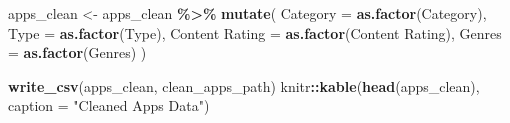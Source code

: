 \documentclass[
]{article}
\newenvironment{Shaded}{\begin{snugshade}}{\end{snugshade}}
\newcommand{\AttributeTok}[1]{\textcolor[rgb]{0.13,0.29,0.53}{#1}}
\newcommand{\FunctionTok}[1]{\textcolor[rgb]{0.13,0.29,0.53}{\textbf{#1}}}
\newcommand{\NormalTok}[1]{#1}
\newcommand{\OtherTok}[1]{\textcolor[rgb]{0.56,0.35,0.01}{#1}}
\newcommand{\SpecialCharTok}[1]{\textcolor[rgb]{0.81,0.36,0.00}{\textbf{#1}}}
\newcommand{\StringTok}[1]{\textcolor[rgb]{0.31,0.60,0.02}{#1}}
\begin{document}
\begin{Shaded}
\begin{Highlighting}[]
\NormalTok{apps\_clean }\OtherTok{\textless{}{-}}\NormalTok{ apps\_clean }\SpecialCharTok{\%\textgreater{}\%}
    \FunctionTok{mutate}\NormalTok{(}
        \AttributeTok{Category =} \FunctionTok{as.factor}\NormalTok{(Category),}
        \AttributeTok{Type =} \FunctionTok{as.factor}\NormalTok{(Type),}
        \StringTok{\textasciigrave{}}\AttributeTok{Content Rating}\StringTok{\textasciigrave{}} \OtherTok{=} \FunctionTok{as.factor}\NormalTok{(}\StringTok{\textasciigrave{}}\AttributeTok{Content Rating}\StringTok{\textasciigrave{}}\NormalTok{),}
        \AttributeTok{Genres =} \FunctionTok{as.factor}\NormalTok{(Genres)}
\NormalTok{    )}

\FunctionTok{write\_csv}\NormalTok{(apps\_clean, clean\_apps\_path)}
\NormalTok{knitr}\SpecialCharTok{::}\FunctionTok{kable}\NormalTok{(}\FunctionTok{head}\NormalTok{(apps\_clean), }\AttributeTok{caption =} \StringTok{"Cleaned Apps Data"}\NormalTok{)}
\end{Highlighting}
\end{Shaded}
\end{document}
